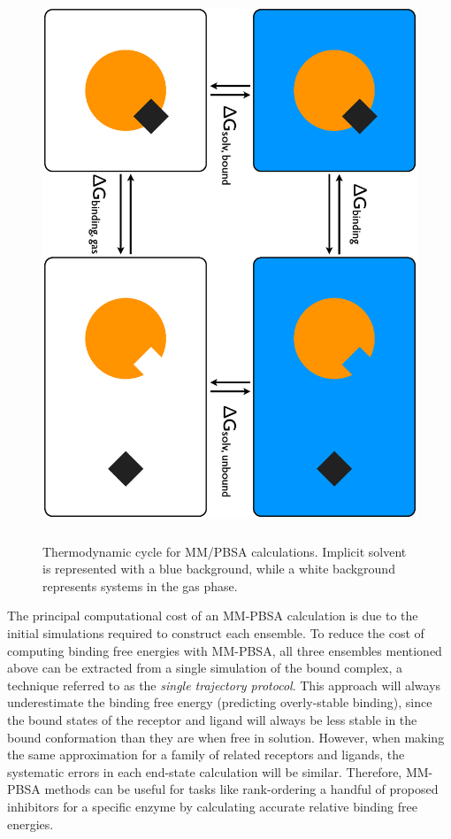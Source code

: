 \begin{figure}
   \includegraphics[height=6.5in, angle=90]{MMPBSA.ps}
   \caption[Thermodynamic cycle for MM/PBSA calculations.]
           {Thermodynamic cycle for MM/PBSA calculations. Implicit solvent is
            represented with a blue background, while a white background
            represents systems in the gas phase.}
   \label{fig2:MMPBSA}
\end{figure}

The principal computational cost of an MM-PBSA calculation is due to the initial
simulations required to construct each ensemble. To reduce the cost of computing
binding free energies with MM-PBSA, all three ensembles mentioned above can be
extracted from a single simulation of the bound complex, a technique referred to
as the \emph{single trajectory protocol}. \cite{MMPBSApy} This approach will
always underestimate the binding free energy (predicting overly-stable binding),
since the bound states of the receptor and ligand will always be less stable in
the bound conformation than they are when free in solution. However, when making
the same approximation for a family of related receptors and ligands, the
systematic errors in each end-state calculation will be similar. Therefore,
MM-PBSA methods can be useful for tasks like rank-ordering a handful of proposed
inhibitors for a specific enzyme by calculating accurate relative binding free
energies. \cite{Homeyer2012}

